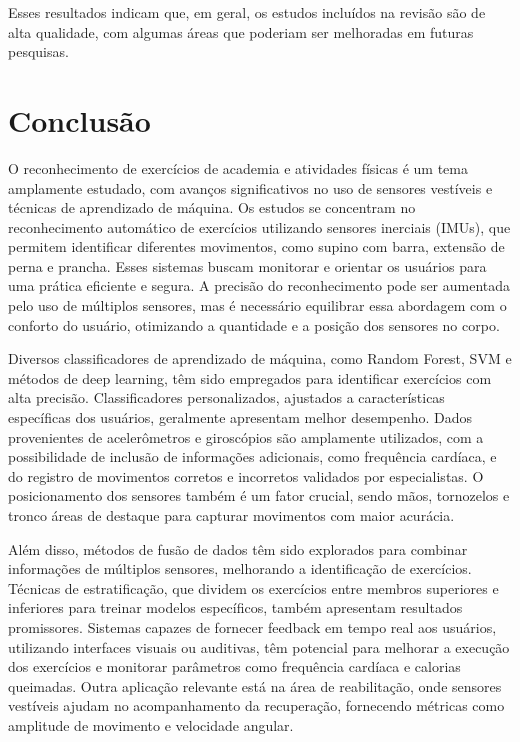 \documentclass[conference]{IEEEtran}
\begin{document}
Esses resultados indicam que, em geral, os estudos incluídos na revisão são de alta qualidade, com algumas áreas que poderiam ser melhoradas em futuras pesquisas.

\newpage

\section{Conclusão}
\label{sec:conclusao}
O reconhecimento de exercícios de academia e atividades físicas é um tema amplamente estudado, com avanços significativos no uso de sensores vestíveis e técnicas de aprendizado de máquina. Os estudos se concentram no reconhecimento automático de exercícios utilizando sensores inerciais (IMUs), que permitem identificar diferentes movimentos, como supino com barra, extensão de perna e prancha. Esses sistemas buscam monitorar e orientar os usuários para uma prática eficiente e segura. A precisão do reconhecimento pode ser aumentada pelo uso de múltiplos sensores, mas é necessário equilibrar essa abordagem com o conforto do usuário, otimizando a quantidade e a posição dos sensores no corpo.

Diversos classificadores de aprendizado de máquina, como Random Forest, SVM e métodos de deep learning, têm sido empregados para identificar exercícios com alta precisão. Classificadores personalizados, ajustados a características específicas dos usuários, geralmente apresentam melhor desempenho. Dados provenientes de acelerômetros e giroscópios são amplamente utilizados, com a possibilidade de inclusão de informações adicionais, como frequência cardíaca, e do registro de movimentos corretos e incorretos validados por especialistas. O posicionamento dos sensores também é um fator crucial, sendo mãos, tornozelos e tronco áreas de destaque para capturar movimentos com maior acurácia.

Além disso, métodos de fusão de dados têm sido explorados para combinar informações de múltiplos sensores, melhorando a identificação de exercícios. Técnicas de estratificação, que dividem os exercícios entre membros superiores e inferiores para treinar modelos específicos, também apresentam resultados promissores. Sistemas capazes de fornecer feedback em tempo real aos usuários, utilizando interfaces visuais ou auditivas, têm potencial para melhorar a execução dos exercícios e monitorar parâmetros como frequência cardíaca e calorias queimadas. Outra aplicação relevante está na área de reabilitação, onde sensores vestíveis ajudam no acompanhamento da recuperação, fornecendo métricas como amplitude de movimento e velocidade angular.
\end{document}
